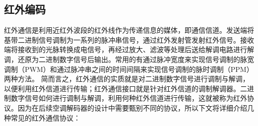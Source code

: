 




\subsection{红外编码}
红外通信是利用近红外波段的红外线作为传递信息的媒体，即通信信道。发送端将基带二进制信号调制为一系列的脉冲串信号，通过红外发射管发射红外信号。接收端将接收到的光脉转换成电信号，再经过放大、滤波等处理后送给解调电路进行解调，还原为二进制数字信号后输出。常用的有通过脉冲宽度来实现信号调制的脉宽调制（PWM）和通过脉冲串之间的时间间隔来实现信号调制的脉时调制（PPM）两种方法。 简而言之，红外通信的实质就是对二进制数字信号进行调制与解调，以便利用红外信道进行传输；红外通信接口就是针对红外信道的调制解调器。二进制数字信号如何进行调制与解调，利用何种红外信道进行传输，这就被称为红外协议。因为在后续空调解码器的设计中需要甄别不同的协议，所以下文将详细介绍几种常见的红外通信协议：

